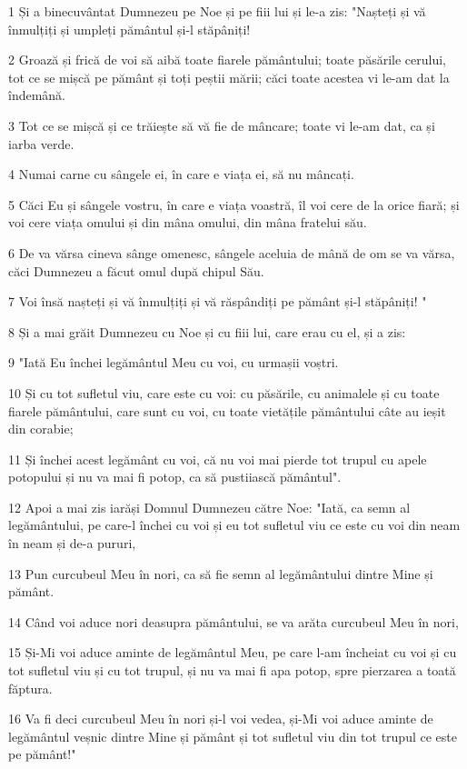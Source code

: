 \par 1 Și a binecuvântat Dumnezeu pe Noe și pe fiii lui și le-a zis: "Nașteți și vă înmulțiți și umpleți pământul și-l stăpâniți!
\par 2 Groază și frică de voi să aibă toate fiarele pământului; toate păsările cerului, tot ce se mișcă pe pământ și toți peștii mării; căci toate acestea vi le-am dat la îndemână.
\par 3 Tot ce se mișcă și ce trăiește să vă fie de mâncare; toate vi le-am dat, ca și iarba verde.
\par 4 Numai carne cu sângele ei, în care e viața ei, să nu mâncați.
\par 5 Căci Eu și sângele vostru, în care e viața voastră, îl voi cere de la orice fiară; și voi cere viața omului și din mâna omului, din mâna fratelui său.
\par 6 De va vărsa cineva sânge omenesc, sângele aceluia de mână de om se va vărsa, căci Dumnezeu a făcut omul după chipul Său.
\par 7 Voi însă nașteți și vă înmulțiți și vă răspândiți pe pământ și-l stăpâniți! "
\par 8 Și a mai grăit Dumnezeu cu Noe și cu fiii lui, care erau cu el, și a zis:
\par 9 "Iată Eu închei legământul Meu cu voi, cu urmașii voștri.
\par 10 Și cu tot sufletul viu, care este cu voi: cu păsările, cu animalele și cu toate fiarele pământului, care sunt cu voi, cu toate vietățile pământului câte au ieșit din corabie;
\par 11 Și închei acest legământ cu voi, că nu voi mai pierde tot trupul cu apele potopului și nu va mai fi potop, ca să pustiiască pământul".
\par 12 Apoi a mai zis iarăși Domnul Dumnezeu către Noe: "Iată, ca semn al legământului, pe care-l închei cu voi și eu tot sufletul viu ce este cu voi din neam în neam și de-a pururi,
\par 13 Pun curcubeul Meu în nori, ca să fie semn al legământului dintre Mine și pământ.
\par 14 Când voi aduce nori deasupra pământului, se va arăta curcubeul Meu în nori,
\par 15 Și-Mi voi aduce aminte de legământul Meu, pe care l-am încheiat cu voi și cu tot sufletul viu și cu tot trupul, și nu va mai fi apa potop, spre pierzarea a toată făptura.
\par 16 Va fi deci curcubeul Meu în nori și-l voi vedea, și-Mi voi aduce aminte de legământul veșnic dintre Mine și pământ și tot sufletul viu din tot trupul ce este pe pământ!"
